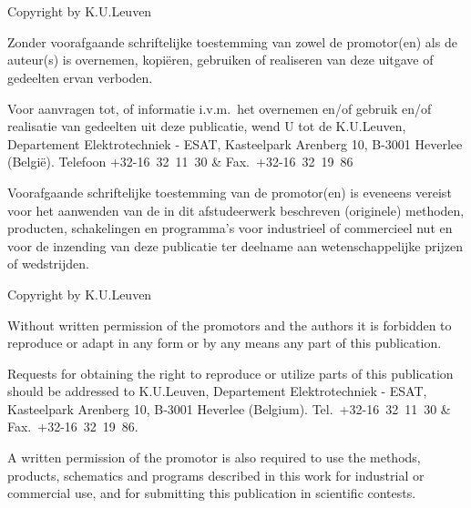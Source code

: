 \section*{}
\thispagestyle{empty}

\vfill

Copyright by K.U.Leuven

\bigskip \noindent Zonder voorafgaande schriftelijke toestemming van zowel de promotor(en) als de auteur(s) is overnemen, kopi\"eren, gebruiken of realiseren van deze uitgave of gedeelten ervan verboden. 

\medskip \noindent Voor aanvragen tot, of informatie i.v.m.\ het overnemen en/of gebruik en/of realisatie van gedeelten uit deze publicatie, wend U tot de K.U.Leuven, Departement Elektrotechniek - ESAT, Kasteelpark Arenberg 10, B-3001 Heverlee (Belgi\"e). Telefoon +32-16~32~11~30 \& Fax.\ +32-16~32~19~86

\medskip \noindent Voorafgaande schriftelijke toestemming van de promotor(en) is eveneens vereist voor het aanwenden van de in dit afstudeerwerk beschreven (originele) methoden, producten, schakelingen en programma's voor industrieel of commercieel nut en voor de inzending van deze publicatie ter deelname aan wetenschappelijke prijzen of wedstrijden.

\bigskip
\bigskip
\bigskip

\noindent Copyright by K.U.Leuven

\bigskip \noindent Without written permission of the promotors and the authors it is forbidden to reproduce or adapt in any form or by any means any part of this publication. 

\medskip \noindent Requests for obtaining the right to reproduce or utilize parts of this publication should be addressed to K.U.Leuven, Departement Elektrotechniek - ESAT, Kasteelpark Arenberg 10,  B‑3001 Heverlee  (Belgium). Tel.\ +32-16~32~11~30 \& Fax.\ +32-16~32~19~86.

\medskip \noindent A written permission of the promotor is also required to use the methods, products, schematics and programs described in this work for industrial or commercial use, and for submitting this publication in scientific contests.

\clearpage
